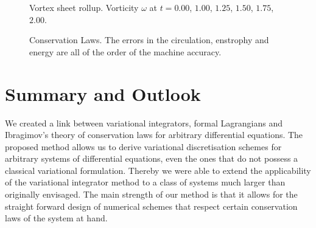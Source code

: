 \documentclass[12pt,a4paper,reqno]{article}
\begin{document}
\begin{figure}[p]
	\centering
	
	
	
	\caption{Vortex sheet rollup. Vorticity $\omega$ at $t=0.00$, $1.00$, $1.25$, $1.50$, $1.75$, $2.00$.}
	\label{fig:vorticity_vortex_sheet_rollup_vorticity}
\end{figure}

\begin{figure}[p]
	\centering


	\caption{Conservation Laws. The errors in the circulation, enstrophy and energy are all of the order of the machine accuracy.}
\end{figure}

\clearpage

\section{Summary and Outlook}
\label{sec:summary}

We created a link between variational integrators, formal Lagrangians and Ibragimov's theory of conservation laws for arbitrary differential equations.
The proposed method allows us to derive variational discretisation schemes for arbitrary systems of differential equations, even the ones that do not possess a classical variational formulation.
Thereby we were able to extend the applicability of the variational integrator method to a class of systems much larger than originally envisaged.
The main strength of our method is that it allows for the straight forward design of numerical schemes that respect certain conservation laws of the system at hand.
\end{document}
